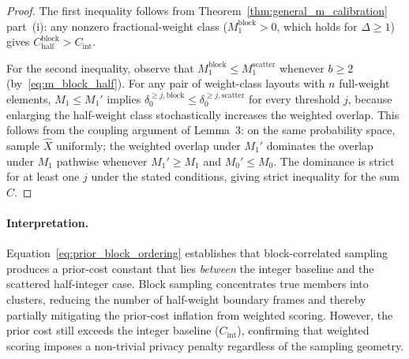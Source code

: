 \documentclass[letterpaper]{article} %
\begin{document}
\begin{proof}
The first inequality follows from Theorem~\ref{thm:general_m_calibration}
part~(i): any nonzero fractional-weight class ($M_1^{\mathrm{block}} > 0$,
which holds for $\Delta \ge 1$) gives
$C^{\mathrm{block}}_{\mathrm{half}} > C_{\mathrm{int}}$.

For the second inequality, observe that
$M_1^{\mathrm{block}} \le M_1^{\mathrm{scatter}}$ whenever
$b \ge 2$ (by~\eqref{eq:m_block_half}).  For any pair of
weight-class layouts with $n$ full-weight elements,
$M_1 \le M_1'$ implies
$\delta_0^{\ge j,\mathrm{block}} \le \delta_0^{\ge j,\mathrm{scatter}}$
for every threshold $j$, because enlarging the half-weight class
stochastically increases the weighted overlap.  This follows from the
coupling argument of Lemma~3: on the same probability space, sample
$\hat{X}$ uniformly; the weighted overlap under $M_1'$ dominates
the overlap under $M_1$ pathwise whenever
$M_1' \ge M_1$ and $M_0' \le M_0$.  The dominance is strict for
at least one $j$ under the stated conditions, giving strict inequality
for the sum $C$.
\end{proof}

\paragraph{Interpretation.}
Equation~\eqref{eq:prior_block_ordering} establishes that
block-correlated sampling produces a prior-cost constant that
lies \emph{between} the integer baseline and the scattered
half-integer case.  Block sampling concentrates true members into
clusters, reducing the number of half-weight boundary frames and
thereby partially mitigating the prior-cost inflation from
weighted scoring.  However, the prior cost still exceeds the
integer baseline ($C_{\mathrm{int}}$), confirming that weighted
scoring imposes a non-trivial privacy penalty regardless of the
sampling geometry.
\end{document}
